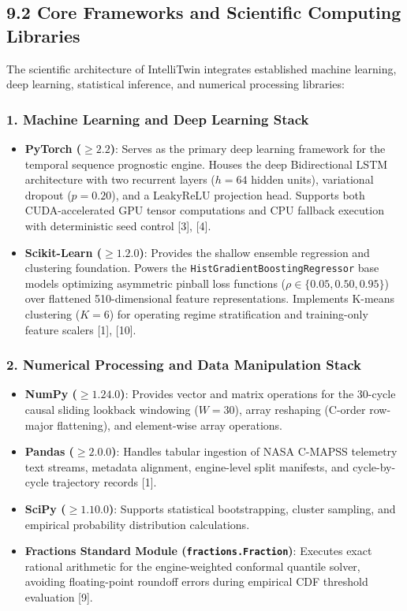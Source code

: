 \documentclass[12pt,a4paper]{article}
\begin{document}
\subsection*{9.2 Core Frameworks and Scientific Computing Libraries}
The scientific architecture of IntelliTwin integrates established machine learning, deep learning, statistical inference, and numerical processing libraries:

\subsubsection*{1. Machine Learning and Deep Learning Stack}
\begin{itemize}
    \item \textbf{PyTorch ($\ge 2.2$)}: Serves as the primary deep learning framework for the temporal sequence prognostic engine. Houses the deep Bidirectional LSTM architecture with two recurrent layers ($h = 64$ hidden units), variational dropout ($p = 0.20$), and a LeakyReLU projection head. Supports both CUDA-accelerated GPU tensor computations and CPU fallback execution with deterministic seed control [3], [4].
    \item \textbf{Scikit-Learn ($\ge 1.2.0$)}: Provides the shallow ensemble regression and clustering foundation. Powers the \texttt{HistGradientBoostingRegressor} base models optimizing asymmetric pinball loss functions ($\rho \in \{0.05, 0.50, 0.95\}$) over flattened 510-dimensional feature representations. Implements K-means clustering ($K = 6$) for operating regime stratification and training-only feature scalers [1], [10].
\end{itemize}

\subsubsection*{2. Numerical Processing and Data Manipulation Stack}
\begin{itemize}
    \item \textbf{NumPy ($\ge 1.24.0$)}: Provides vector and matrix operations for the 30-cycle causal sliding lookback windowing ($W = 30$), array reshaping (C-order row-major flattening), and element-wise array operations.
    \item \textbf{Pandas ($\ge 2.0.0$)}: Handles tabular ingestion of NASA C-MAPSS telemetry text streams, metadata alignment, engine-level split manifests, and cycle-by-cycle trajectory records [1].
    \item \textbf{SciPy ($\ge 1.10.0$)}: Supports statistical bootstrapping, cluster sampling, and empirical probability distribution calculations.
    \item \textbf{Fractions Standard Module (\texttt{fractions.Fraction})}: Executes exact rational arithmetic for the engine-weighted conformal quantile solver, avoiding floating-point roundoff errors during empirical CDF threshold evaluation [9].
\end{itemize}
\end{document}
